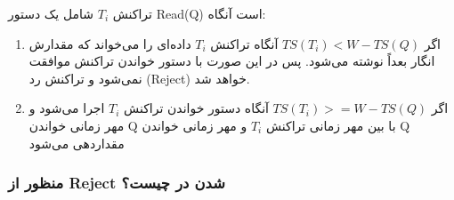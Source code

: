 تراکنش $T_i$ شامل یک دستور Read(Q) است آنگاه:

\begin{enumerate}
    \item اگر $TS(T_i) < W-TS(Q)$ آنگاه تراکنش $T_i$ داده‌ای را می‌خواند که
    مقدارش انگار بعداً نوشته می‌شود. پس در این صورت با دستور خواندن تراکنش
    موافقت نمی‌شود و تراکنش رد (Reject) خواهد شد.
    \begin{LTR}
        \begin{table}[h]
            \begin{RTL}
                \caption{بررسی مهر زمانی در قاعده خواندن}
            \end{RTL}
            \centering
        \end{table}
    \end{LTR}

    \item اگر $TS(T_i) >= W-TS(Q)$ آنگاه دستور خواندن تراکنش $T_i$ اجرا می‌شود و
    مهر زمانی خواندن Q با  بین مهر زمانی تراکنش $T_i$ و مهر زمانی خواندن
    Q مقداردهی می‌شود

    \begin{LTR}
        \begin{table}[h]
            \begin{RTL}
                \caption{بررسی مهر زمانی در قاعده خواندن}
            \end{RTL}
            \centering
        \end{table}
    \end{LTR}

\end{enumerate}

\subsubsection*{منظور از Reject شدن در چیست؟}

